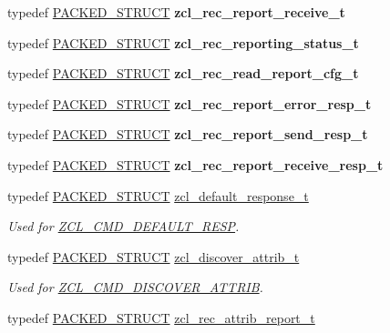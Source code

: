 \begin{DoxyCompactItemize}
typedef \hyperlink{group___s_x_a_ga4233297bd31be5c273d4fb0758cc54d7}{P\-A\-C\-K\-E\-D\-\_\-\-S\-T\-R\-U\-C\-T} {\bfseries zcl\-\_\-rec\-\_\-report\-\_\-receive\-\_\-t}
\item 
typedef \hyperlink{group___s_x_a_ga4233297bd31be5c273d4fb0758cc54d7}{P\-A\-C\-K\-E\-D\-\_\-\-S\-T\-R\-U\-C\-T} {\bfseries zcl\-\_\-rec\-\_\-reporting\-\_\-status\-\_\-t}
\item 
typedef \hyperlink{group___s_x_a_ga4233297bd31be5c273d4fb0758cc54d7}{P\-A\-C\-K\-E\-D\-\_\-\-S\-T\-R\-U\-C\-T} {\bfseries zcl\-\_\-rec\-\_\-read\-\_\-report\-\_\-cfg\-\_\-t}
\item 
typedef \hyperlink{group___s_x_a_ga4233297bd31be5c273d4fb0758cc54d7}{P\-A\-C\-K\-E\-D\-\_\-\-S\-T\-R\-U\-C\-T} {\bfseries zcl\-\_\-rec\-\_\-report\-\_\-error\-\_\-resp\-\_\-t}
\item 
typedef \hyperlink{group___s_x_a_ga4233297bd31be5c273d4fb0758cc54d7}{P\-A\-C\-K\-E\-D\-\_\-\-S\-T\-R\-U\-C\-T} {\bfseries zcl\-\_\-rec\-\_\-report\-\_\-send\-\_\-resp\-\_\-t}
\item 
typedef \hyperlink{group___s_x_a_ga4233297bd31be5c273d4fb0758cc54d7}{P\-A\-C\-K\-E\-D\-\_\-\-S\-T\-R\-U\-C\-T} {\bfseries zcl\-\_\-rec\-\_\-report\-\_\-receive\-\_\-resp\-\_\-t}
\item 
typedef \hyperlink{group___s_x_a_ga4233297bd31be5c273d4fb0758cc54d7}{P\-A\-C\-K\-E\-D\-\_\-\-S\-T\-R\-U\-C\-T} \hyperlink{group__zcl_ga71b28f3a9303e556e06d1a4d18c7a834}{zcl\-\_\-default\-\_\-response\-\_\-t}
\begin{DoxyCompactList}\small\item\em Used for \hyperlink{group__zcl_ga92499f538455b8d5a525510fba54adb2}{Z\-C\-L\-\_\-\-C\-M\-D\-\_\-\-D\-E\-F\-A\-U\-L\-T\-\_\-\-R\-E\-S\-P}. \end{DoxyCompactList}\item 
typedef \hyperlink{group___s_x_a_ga4233297bd31be5c273d4fb0758cc54d7}{P\-A\-C\-K\-E\-D\-\_\-\-S\-T\-R\-U\-C\-T} \hyperlink{group__zcl_gab0970af8e1b078745a55523dd60bdff6}{zcl\-\_\-discover\-\_\-attrib\-\_\-t}
\begin{DoxyCompactList}\small\item\em Used for \hyperlink{group__zcl_ga2919d6fc8068efac4c9969938a4b9ff5}{Z\-C\-L\-\_\-\-C\-M\-D\-\_\-\-D\-I\-S\-C\-O\-V\-E\-R\-\_\-\-A\-T\-T\-R\-I\-B}. \end{DoxyCompactList}\item 
typedef \hyperlink{group___s_x_a_ga4233297bd31be5c273d4fb0758cc54d7}{P\-A\-C\-K\-E\-D\-\_\-\-S\-T\-R\-U\-C\-T} \hyperlink{group__zcl_ga4c81303b52f05c2819ac615fa92e0e5f}{zcl\-\_\-rec\-\_\-attrib\-\_\-report\-\_\-t}

\end{DoxyCompactItemize}
